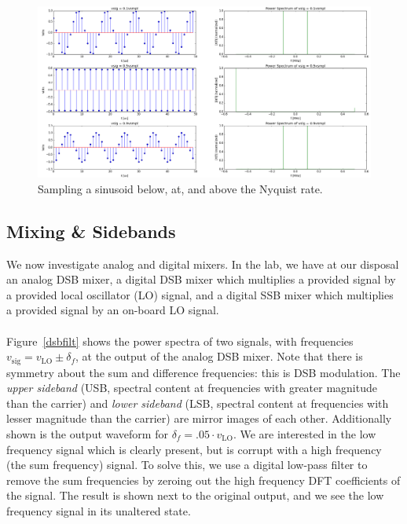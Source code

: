 \documentclass[11pt]{article}
\begin{document}
    \begin{figure}[H]
        \centering
            \includegraphics[width = \textwidth]{1_3_sampling.png}
        \caption{Sampling a sinusoid below, at, and above the Nyquist rate.}
        \label{nyquist}
    \end{figure}


    \subsection{Mixing \& Sidebands}
    We now investigate analog and digital mixers. In the lab, we have at our disposal an analog DSB mixer, a digital DSB mixer which multiplies a provided signal by a provided local oscillator (LO) signal, and a digital SSB mixer which multiplies a provided signal by an on-board LO signal.\\
    \\
    \noindent Figure~\ref{dsbfilt} shows the power spectra of two signals, with frequencies $v_{\text{sig}} = v_{\text{LO}} \pm \delta_f$, at the output of the analog DSB mixer. Note that there is symmetry about the sum and difference frequencies: this is DSB modulation. The \emph{upper sideband} (USB, spectral content at frequencies with greater magnitude than the carrier) and \emph{lower sideband} (LSB, spectral content at frequencies with lesser magnitude than the carrier) are mirror images of each other. Additionally shown is the output waveform for $\delta_f = .05\cdot v_{\text{LO}}$. We are interested in the low frequency signal which is clearly present, but is corrupt with a high frequency (the sum frequency) signal. To solve this, we use a digital low-pass filter to remove the sum frequencies by zeroing out the high frequency DFT coefficients of the signal. The result is shown next to the original output, and we see the low frequency signal in its unaltered state.
\end{document}

